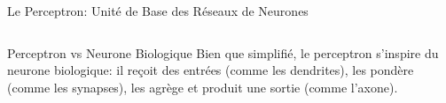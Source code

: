 \documentclass[aspectratio=169,11pt]{beamer}
\begin{document}
\begin{frame}{Le Perceptron: Unité de Base des Réseaux de Neurones}
\begin{columns}
\begin{column}{0.45\textwidth}
\begin{center}
            \end{center}
            \vspace{0.1cm}
            \begin{alertblock}{Perceptron vs Neurone Biologique}
                Bien que simplifié, le perceptron s'inspire du neurone biologique: il reçoit des entrées (comme les dendrites), les pondère (comme les synapses), les agrège et produit une sortie (comme l'axone).
            \end{alertblock}
        \end{column}
    \end{columns}
\end{frame}
\end{document}
